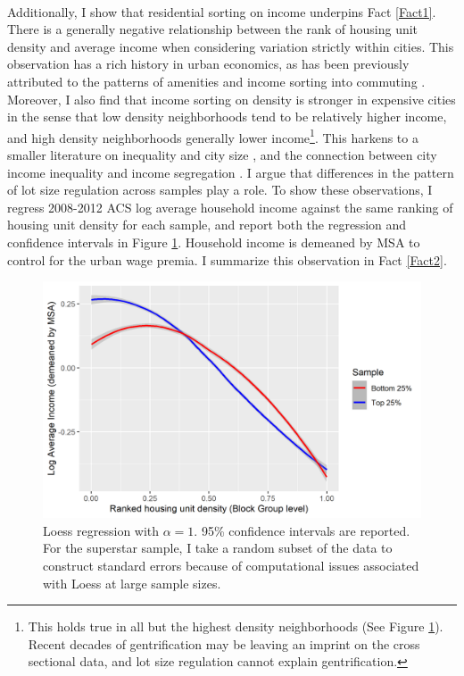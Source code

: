 \documentclass[]{article}
\begin{document}
\paragraph*{}
Additionally, I show that  residential sorting on income underpins Fact \ref{Fact1}. There is a generally negative relationship between the rank of housing unit density and average income when considering variation strictly within cities. This observation has a rich history in urban economics, as has been previously attributed to the patterns of amenities \citep{parispoor} and income sorting into commuting \citep{ccpoortransport}. Moreover, I also find that income sorting on density is stronger in expensive cities in the sense that low density neighborhoods tend to be relatively higher income, and high density neighborhoods generally lower income\footnote{This holds true in all but the highest density neighborhoods (See Figure \ref{incomesorting}). Recent decades of gentrification may be leaving an imprint on the cross sectional data, and lot size regulation cannot explain gentrification.}. This harkens to a smaller literature on inequality and city size \citep{ineqcitysize} \citep{spatialsorting}, and the connection between city income inequality and income segregation \citep{FogliGuerrieri}. I argue that differences in the pattern of lot size regulation across samples play a role. To show these observations, I regress 2008-2012 ACS log average household income against the same ranking of housing unit density for each sample, and report both the regression and confidence intervals in Figure \ref{incomesorting}. Household income is demeaned by MSA to control for the urban wage premia. I summarize this observation in Fact \ref{Fact2}.

\begin{figure}[!ht]
	\begin{center}
		\includegraphics[width=1.1\textwidth]{income.png}
		\caption{Loess regression with $\alpha = 1$. 95\% confidence intervals are reported. For the superstar sample, I take a random subset of the data to construct standard errors because of computational issues associated with Loess at large sample sizes.}\label{incomesorting}
	\end{center}
\end{figure}
\end{document}
